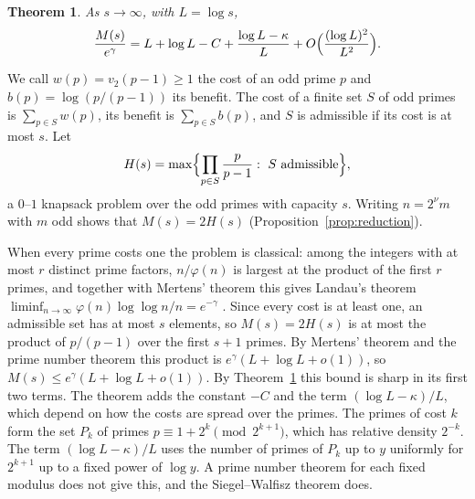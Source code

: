\documentclass[11pt]{amsart}
\newtheorem{theorem}{Theorem}[section]
\theoremstyle{remark}
\numberwithin{equation}{section}
\begin{document}
\begin{theorem}\label{thm:main}
As $s\to\infty$, with $L=\log s$,
\begin{equation}\label{eq:main}
\frac{M(s)}{e^\gamma}=L+\log L-C+\frac{\log L-\kappa}{L}
+O\Bigl(\frac{(\log L)^2}{L^2}\Bigr).
\end{equation}
\end{theorem}

We call $w(p)=v_2(p-1)\ge1$ the cost of an odd prime $p$ and
$b(p)=\log(p/(p-1))$ its benefit. The cost of a finite set $S$ of odd
primes is $\sum_{p\in S}w(p)$, its benefit is $\sum_{p\in S}b(p)$, and $S$ is admissible if its cost is at
most $s$. Let
\[
H(s)=\max\Bigl\{\prod_{p\in S}\frac{p}{p-1}:\ S\ \text{admissible}\Bigr\},
\]
a $0$--$1$ knapsack problem over the odd primes with capacity $s$.
Writing $n=2^\nu m$ with $m$ odd shows that $M(s)=2H(s)$
(Proposition~\ref{prop:reduction}).

When every prime costs one the problem is classical: among the integers
with at most $r$ distinct prime factors, $n/\varphi(n)$ is largest at the
product of the first $r$ primes, and together with Mertens' theorem this
gives Landau's theorem
$\liminf_{n\to\infty}\varphi(n)\log\log n/n=e^{-\gamma}$
\cite[Theorem~328]{HW}. Since every cost is at least one, an admissible
set has at most $s$ elements, so $M(s)=2H(s)$ is at most the product of
$p/(p-1)$ over the first $s+1$ primes. By Mertens' theorem
\cite[Lemma~8]{Ju23} and the prime number theorem this product is
$e^\gamma(L+\log L+o(1))$, so $M(s)\le e^\gamma(L+\log L+o(1))$. By
Theorem~\ref{thm:main} this bound is sharp in its first two terms. The theorem adds the constant
$-C$ and the term $(\log L-\kappa)/L$, which depend on how the costs are
spread over the primes. The primes of cost $k$ form the set
$P_k$ of primes $p\equiv1+2^k\pmod{2^{k+1}}$, which has relative
density $2^{-k}$.
The term $(\log L-\kappa)/L$ uses the number of primes of $P_k$ up to $y$
uniformly for $2^{k+1}$ up to a fixed power of $\log y$. A prime number theorem for each
fixed modulus does not give this, and the Siegel--Walfisz theorem
\cite[Theorem~12.1]{Kou} does.
\end{document}
